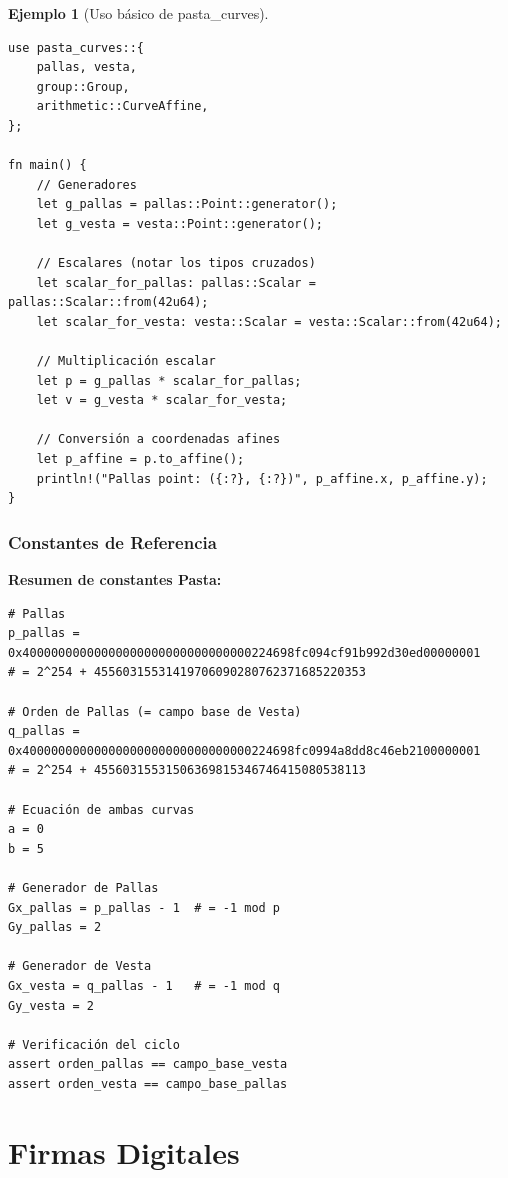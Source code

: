 \documentclass[11pt,a4paper,twoside,openright]{book}
\theoremstyle{definition}
\newtheorem{example}{Ejemplo}[chapter]
\theoremstyle{plain}
\theoremstyle{remark}
\begin{document}
\begin{example}[Uso básico de pasta\_curves]
\begin{verbatim}
use pasta_curves::{
    pallas, vesta,
    group::Group,
    arithmetic::CurveAffine,
};

fn main() {
    // Generadores
    let g_pallas = pallas::Point::generator();
    let g_vesta = vesta::Point::generator();
    
    // Escalares (notar los tipos cruzados)
    let scalar_for_pallas: pallas::Scalar = pallas::Scalar::from(42u64);
    let scalar_for_vesta: vesta::Scalar = vesta::Scalar::from(42u64);
    
    // Multiplicación escalar
    let p = g_pallas * scalar_for_pallas;
    let v = g_vesta * scalar_for_vesta;
    
    // Conversión a coordenadas afines
    let p_affine = p.to_affine();
    println!("Pallas point: ({:?}, {:?})", p_affine.x, p_affine.y);
}
\end{verbatim}
\end{example}

\subsubsection{Constantes de Referencia}

\begin{mathnote}
\textbf{Resumen de constantes Pasta:}

\begin{verbatim}
# Pallas
p_pallas = 0x40000000000000000000000000000000224698fc094cf91b992d30ed00000001
# = 2^254 + 45560315531419706090280762371685220353

# Orden de Pallas (= campo base de Vesta)
q_pallas = 0x40000000000000000000000000000000224698fc0994a8dd8c46eb2100000001
# = 2^254 + 45560315531506369815346746415080538113

# Ecuación de ambas curvas
a = 0
b = 5

# Generador de Pallas
Gx_pallas = p_pallas - 1  # = -1 mod p
Gy_pallas = 2

# Generador de Vesta  
Gx_vesta = q_pallas - 1   # = -1 mod q
Gy_vesta = 2

# Verificación del ciclo
assert orden_pallas == campo_base_vesta
assert orden_vesta == campo_base_pallas
\end{verbatim}
\end{mathnote}

\section{Firmas Digitales}
\end{document}
